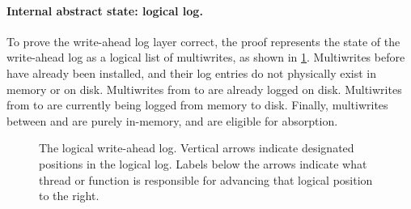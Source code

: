 


\paragraph{Internal abstract state: logical log.}
To prove the write-ahead log layer correct, the proof represents the
state of the write-ahead log as a logical list of multiwrites, as
shown in \cref{fig:log}.  Multiwrites before  have
already been installed, and their log entries do not physically exist in memory or on disk.
Multiwrites from  to  are already logged on
disk.  Multiwrites from  to  are currently being logged
from memory to disk.  Finally, multiwrites between 
and  are purely in-memory, and are eligible for absorption.

\begin{figure}[ht]
  \centering
    
    \vspace{0.5 \baselineskip}
    \caption{The logical write-ahead log.  Vertical arrows indicate
        designated positions in the logical log.  Labels below the arrows
        indicate what thread or function is responsible for advancing
        that logical position to the right.}
    \label{fig:log}
\end{figure}

